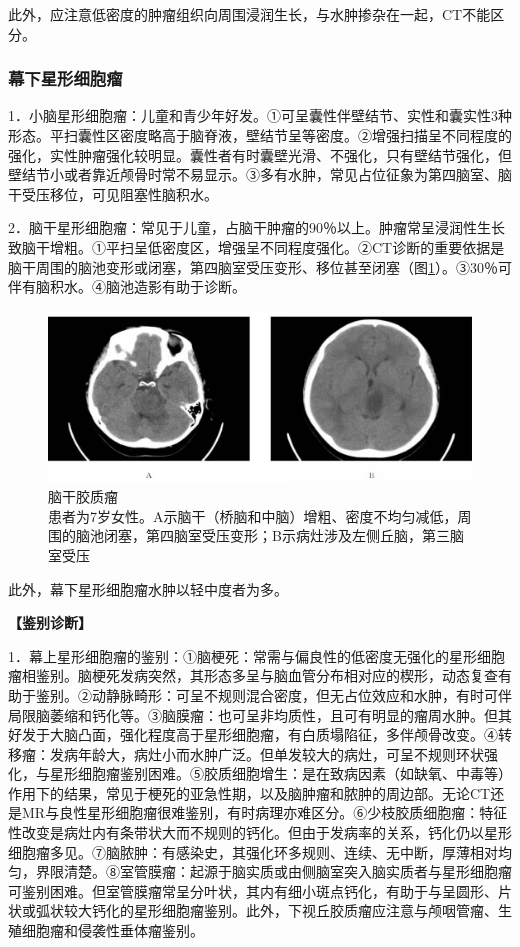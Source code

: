 此外，应注意低密度的肿瘤组织向周围浸润生长，与水肿掺杂在一起，CT不能区分。

\subsubsection{幕下星形细胞瘤}

1．小脑星形细胞瘤：儿童和青少年好发。①可呈囊性伴壁结节、实性和囊实性3种形态。平扫囊性区密度略高于脑脊液，壁结节呈等密度。②增强扫描呈不同程度的强化，实性肿瘤强化较明显。囊性者有时囊壁光滑、不强化，只有壁结节强化，但壁结节小或者靠近颅骨时常不易显示。③多有水肿，常见占位征象为第四脑室、脑干受压移位，可见阻塞性脑积水。

2．脑干星形细胞瘤：常见于儿童，占脑干肿瘤的90％以上。肿瘤常呈浸润性生长致脑干增粗。①平扫呈低密度区，增强呈不同程度强化。②CT诊断的重要依据是脑干周围的脑池变形或闭塞，第四脑室受压变形、移位甚至闭塞（图\ref{fig2-40}）。③30％可伴有脑积水。④脑池造影有助于诊断。

\begin{figure}[!htbp]
 \centering
 \includegraphics[width=.7\textwidth,height=\textheight,keepaspectratio]{./images/Image00068.jpg}
 \captionsetup{justification=centering}
 \caption{脑干胶质瘤\\{\small 患者为7岁女性。A示脑干（桥脑和中脑）增粗、密度不均匀减低，周围的脑池闭塞，第四脑室受压变形；B示病灶涉及左侧丘脑，第三脑室受压}}
 \label{fig2-40}
  \end{figure} 

此外，幕下星形细胞瘤水肿以轻中度者为多。

\textbf{【鉴别诊断】}

1．幕上星形细胞瘤的鉴别：①脑梗死：常需与偏良性的低密度无强化的星形细胞瘤相鉴别。脑梗死发病突然，其形态多呈与脑血管分布相对应的楔形，动态复查有助于鉴别。②动静脉畸形：可呈不规则混合密度，但无占位效应和水肿，有时可伴局限脑萎缩和钙化等。③脑膜瘤：也可呈非均质性，且可有明显的瘤周水肿。但其好发于大脑凸面，强化程度高于星形细胞瘤，有白质塌陷征，多伴颅骨改变。④转移瘤：发病年龄大，病灶小而水肿广泛。但单发较大的病灶，可呈不规则环状强化，与星形细胞瘤鉴别困难。⑤胶质细胞增生：是在致病因素（如缺氧、中毒等）作用下的结果，常见于梗死的亚急性期，以及脑肿瘤和脓肿的周边部。无论CT还是MR与良性星形细胞瘤很难鉴别，有时病理亦难区分。⑥少枝胶质细胞瘤：特征性改变是病灶内有条带状大而不规则的钙化。但由于发病率的关系，钙化仍以星形细胞瘤多见。⑦脑脓肿：有感染史，其强化环多规则、连续、无中断，厚薄相对均匀，界限清楚。⑧室管膜瘤：起源于脑实质或由侧脑室突入脑实质者与星形细胞瘤可鉴别困难。但室管膜瘤常呈分叶状，其内有细小斑点钙化，有助于与呈圆形、片状或弧状较大钙化的星形细胞瘤鉴别。此外，下视丘胶质瘤应注意与颅咽管瘤、生殖细胞瘤和侵袭性垂体瘤鉴别。

